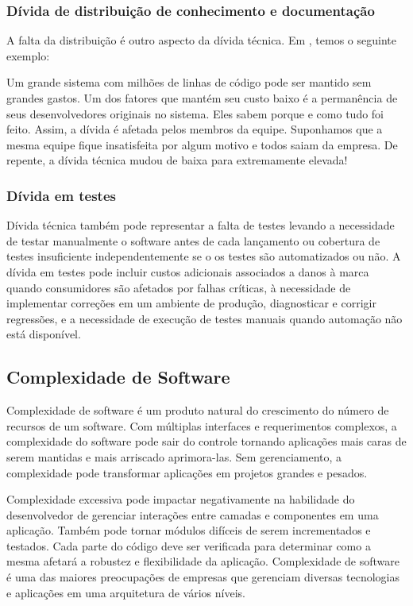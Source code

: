 \subsubsection{Dívida de distribuição de conhecimento e documentação}

A falta da distribuição é outro aspecto da dívida técnica. Em \cite{slinker2008}, temos o seguinte exemplo:
\begin{quoteAbnt}
	Um grande sistema com milhões de linhas de código pode ser mantido sem grandes gastos. Um dos fatores que mantém seu custo baixo é a permanência de seus desenvolvedores originais no sistema. Eles sabem porque e como tudo foi feito. Assim, a dívida é afetada pelos membros da equipe. Suponhamos que a mesma equipe fique insatisfeita por algum motivo e todos saiam da empresa. De repente, a dívida técnica mudou de baixa para extremamente elevada!
\end{quoteAbnt}

\subsubsection{Dívida em testes}

Dívida técnica também pode representar a falta de testes levando a necessidade de testar manualmente o software antes de cada lançamento ou cobertura de testes insuficiente independentemente se o os testes são automatizados ou não. A dívida em testes  pode incluir custos adicionais associados a danos à marca quando consumidores são afetados por falhas críticas, à necessidade de implementar correções em um ambiente de produção, diagnosticar e corrigir regressões, e a necessidade de execução de testes manuais quando automação não está disponível.

\subsection{Complexidade de Software}
Complexidade de software é um produto natural do crescimento do número de recursos de um software. Com múltiplas interfaces e requerimentos complexos, a complexidade do software pode sair do controle tornando aplicações mais caras de serem mantidas e mais arriscado aprimora-las. Sem gerenciamento, a complexidade pode transformar aplicações em projetos grandes e pesados.

Complexidade excessiva pode impactar negativamente na habilidade do desenvolvedor de gerenciar interações entre camadas e componentes em uma aplicação. Também pode tornar módulos difíceis de serem incrementados e testados. Cada parte do código deve ser verificada para determinar como a mesma afetará a robustez e flexibilidade da aplicação. Complexidade de software é uma das maiores preocupações de empresas que gerenciam diversas tecnologias e aplicações em uma arquitetura de vários níveis.

